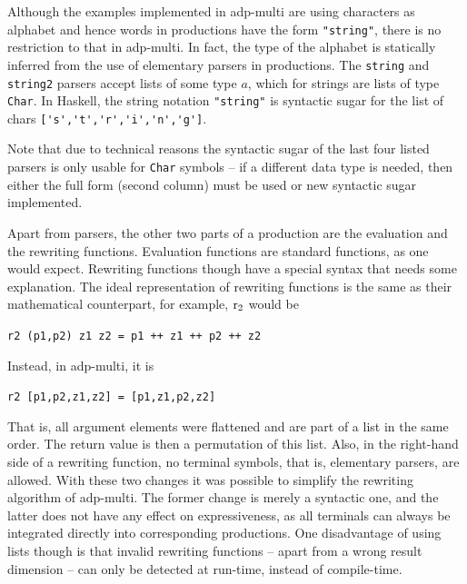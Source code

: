\documentclass[
    a4paper,
    12pt,
    twoside,
    BCOR=12mm,
    parskip=half,
    chapterprefix,
    numbers=noenddot,
    bibliography=totoc
]{scrbook}
\begin{document}
\begin{remark}
Although the examples implemented in adp-multi are using characters as alphabet and hence words in productions have the form \verb|"string"|, there is no restriction to that in adp-multi. In fact, the type of the alphabet is statically inferred from the use of elementary parsers in productions. The \verb|string| and \verb|string2| parsers accept lists of some type $a$, which for strings are lists of type \verb|Char|. In Haskell, the string notation \verb|"string"| is syntactic sugar for the list of chars \verb|['s','t','r','i','n','g']|.

Note that due to technical reasons the syntactic sugar of the last four listed parsers is only usable for \verb|Char| symbols -- if a different data type is needed, then either the full form (second column) must be used or new syntactic sugar implemented.
\end{remark}

Apart from parsers, the other two parts of a production are the evaluation and the rewriting functions. Evaluation functions are standard functions, as one would expect. Rewriting functions though have a special syntax that needs some explanation. The ideal representation of rewriting functions is the same as their mathematical counterpart, for example, $\mathrm{r}_2$ would be
\begin{center}
	\verb|r2 (p1,p2) z1 z2 = p1 ++ z1 ++ p2 ++ z2|
\end{center}
Instead, in adp-multi, it is
\begin{center}
	\verb|r2 [p1,p2,z1,z2] = [p1,z1,p2,z2]|
\end{center}
That is, all argument elements were flattened and are part of a list in the same order. The return value is then a permutation of this list. Also, in the right-hand side of a rewriting function, no terminal symbols, that is, elementary parsers, are allowed. With these two changes it was possible to simplify the rewriting algorithm of adp-multi. The former change is merely a syntactic one, and the latter does not have any effect on expressiveness, as all terminals can always be integrated directly into corresponding productions. One disadvantage of using lists though is that invalid rewriting functions -- apart from a wrong result dimension -- can only be detected at run-time, instead of compile-time.
\end{document}
